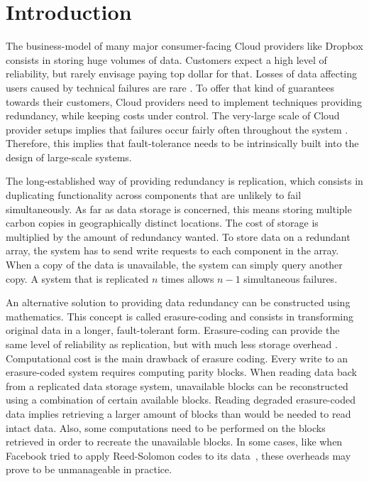 
\section{Introduction}

The business-model of many major consumer-facing Cloud providers like Dropbox consists in storing huge volumes of data.
Customers expect a high level of reliability, but rarely envisage paying top dollar for that.
Losses of data affecting users caused by technical failures are rare \autocite{racs}.
To offer that kind of guarantees towards their customers, Cloud providers need to implement techniques providing redundancy, while keeping costs under control.
The very-large scale of Cloud provider setups implies that failures occur fairly often throughout the system \autocite{failures-study}.
Therefore, this implies that fault-tolerance needs to be intrinsically built into the design of large-scale systems.

The long-established way of providing redundancy is replication, which consists in duplicating functionality across components that are unlikely to fail simultaneously.  As far as data storage is concerned, this means storing multiple carbon copies in geographically distinct locations.
The cost of storage is multiplied by the amount of redundancy wanted.
To store data on a redundant array, the system has to send write requests to each component in the array.
When a copy of the data is unavailable, the system can simply query another copy.
A system that is replicated $n$ times allows $n-1$ simultaneous failures.

An alternative solution to providing data redundancy can be constructed using mathematics.
This concept is called erasure-coding and consists in transforming original data in a longer, fault-tolerant form.
Erasure-coding can provide the same level of reliability as replication, but with much less storage overhead \autocite{Weatherspoon2002}.
Computational cost is the main drawback of erasure coding. 
Every write to an erasure-coded system requires computing parity blocks.
When reading data back from a replicated data storage system, unavailable blocks can be reconstructed using a combination of certain available blocks.
Reading degraded erasure-coded data implies retrieving a larger amount of blocks than would be needed to read intact data.
Also, some computations need to be performed on the blocks retrieved in order to recreate the unavailable blocks.
In some cases, like when Facebook tried to apply Reed-Solomon codes to its data~\autocite{XorbasVLDB}, these overheads may prove to be unmanageable in practice. 

